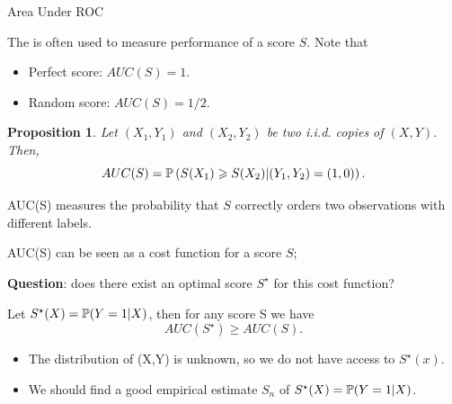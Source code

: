 \documentclass[xcolor={usenames,dvipsnames},handout]{beamer}
\newtheorem{prop}[theorem]{Proposition}
\begin{document}
\begin{frame}[allowframebreaks,fragile=singleslide]{Area Under ROC} 

The  is often used to measure performance of a score $S$.
Note that
\begin{itemize}
\item Perfect score: $AUC(S) = 1$. 
\item Random score: $AUC(S) = 1/2$.
\end{itemize}

\begin{prop} 
Let $(X_1,Y_1)$ and $(X_2,Y_2)$ be two i.i.d. copies of $(X,Y)$. Then,
$$
AUC(S) = \P \left( S(X_1) \geq S(X_2) | (Y_1,Y_2)=(1,0) \right).
$$
\end{prop}

 AUC(S) measures the \alert{probability that $S$ correctly orders two observations with different labels}.


%


AUC(S) can be seen as a cost function for a score $S$;




\framebreak

\textbf{Question}: does there exist an \alert{optimal score $S^\star$ for this cost function}?


\begin{theorem}
Let $S^\star(X)= \P(Y =1|X )$, then for any score S we have 
$$
AUC(S^\star)\geq AUC(S).
$$
\end{theorem}


\begin{itemize}
\item The distribution of (X,Y) is unknown, \alert{so we do not  have access to $S^\star(x)$}.

\vspace{.2cm}

\item We should find a \alert{good empirical  estimate $S_n$ of $S^\star(X)= \P(Y =1|X)$}.
\end{itemize}

\end{frame}
\end{document}
